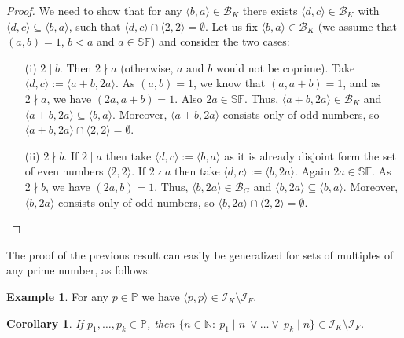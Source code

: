 \documentclass{amsart}
\newtheorem{cor}[thm]{Corollary}
\theoremstyle{definition}
\newtheorem{ex}[thm]{Example}
\newcommand{\N}{{\mathbb N}}
\newcommand{\I}{\mathcal I}
\newcommand{\B}{\mathcal{B}}
\newcommand{\SqrFr}{\mathbb{SF}}
\newcommand{\arithseq}[2]{\langle#2, #1\rangle}
\begin{document}
\begin{proof}
We need to show that for any $\arithseq{a}{b} \in \B_K$ there exists $\arithseq{c}{d} \in \B_K$ with $\arithseq{c}{d} \subseteq \arithseq{a}{b}$, such that $\arithseq{c}{d} \cap \arithseq{2}{2} = \emptyset$. Let us fix $\arithseq{a}{b} \in \B_K$ (we assume that $(a,b)=1$, $b<a$ and $a \in \SqrFr$) and consider the two cases:
\begin{itemize}
 \item[(i)] $2\mid b$. Then $2 \nmid a$ (otherwise, $a$ and $b$ would not be coprime). Take $\arithseq{c}{d} := \arithseq{2a}{a+b}$. As $(a,b)=1$, we know that $(a,a+b)=1$, and as $2 \nmid a$, we have $(2a,a+b)=1$. 
Also $2a\in\SqrFr$. Thus, $\arithseq{2a}{a+b}\in\B_K$ and $\arithseq{2a}{a+b}\subseteq\arithseq{a}{b}$. Moreover, $\arithseq{2a}{a+b}$ consists only of odd numbers, so $\arithseq{2a}{a+b}\cap \arithseq{2}{2} = \emptyset$.
 \item[(ii)] $2\nmid b$. 
If $2\mid a$ then take $\arithseq{c}{d} := \arithseq{a}{b}$
as it is already disjoint form the set of even numbers $\arithseq{2}{2}$.
If $2\nmid a$ then 
take $\arithseq{c}{d} := \arithseq{2a}{b}$. Again $2a\in\SqrFr$. As $2\nmid b$, we have $(2a,b)=1$. 
Thus, $\arithseq{2a}{b}\in\B_G$ and $\arithseq{2a}{b}\subseteq\arithseq{a}{b}$. 
Moreover, $\arithseq{2a}{b}$ consists only of odd numbers, so $\arithseq{2a}{b}\cap \arithseq{2}{2} = \emptyset$.
\end{itemize}
\end{proof}

The proof of the previous result can easily be generalized for sets of multiples of any prime number, as follows:

\begin{ex} 
For any $p\in\mathbb{P}$ we have $\arithseq{p}{p}\in \I_K \setminus \I_F$.
\end{ex}

\begin{cor}
If $p_1, \ldots, p_k \in \mathbb{P}$, then $\{n\in\N :\ p_1\mid n\ \vee \ldots \vee\ p_k\mid n\}\in \I_K \setminus \I_F$.
\end{cor}
\end{document}
